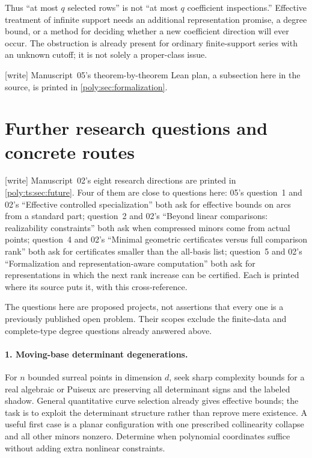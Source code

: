 \documentclass[11pt,a4paper]{article}
\numberwithin{equation}{section}
\theoremstyle{plain}
\newcommand{\wtag}{\textup{[write]}}%
\begin{document}
Thus ``at most $q$ selected rows'' is not ``at most $q$ coefficient
inspections.'' Effective treatment of infinite support needs an additional
representation promise, a degree bound, or a method for deciding whether
a new coefficient direction will ever occur. The obstruction is already
present for ordinary finite-support series with an unknown cutoff; it is
not solely a proper-class issue.

\noindent\wtag{} Manuscript~05's theorem-by-theorem Lean plan, a subsection
here in the source, is printed in \cref{poly:sec:formalization}.


\section{Further research questions and concrete routes}
\label{poly:sec:questions}
\noindent\wtag{} Manuscript~02's eight research directions are printed in
\cref{poly:ts:sec:future}. Four of them are close to questions here: 05's
question~1 and 02's ``Effective controlled specialization'' both ask for
effective bounds on arcs from a standard part; question~2 and 02's
``Beyond linear comparisons: realizability constraints'' both ask when
compressed minors come from actual points; question~4 and 02's ``Minimal
geometric certificates versus full comparison rank'' both ask for
certificates smaller than the all-basis list; question~5 and 02's
``Formalization and representation-aware computation'' both ask for
representations in which the next rank increase can be certified. Each is
printed where its source puts it, with this cross-reference.

The questions here are proposed projects, not assertions that every one is
a previously published open problem. Their scopes exclude the finite-data
and complete-type degree questions already answered above.

\paragraph{1. Moving-base determinant degenerations.}
For $n$ bounded surreal points in dimension $d$, seek sharp complexity
bounds for a real algebraic or Puiseux arc preserving all determinant
signs and the labeled shadow. General quantitative curve selection already
gives effective bounds; the task is to exploit the determinant structure
rather than reprove mere existence. A useful first case is a planar
configuration with one prescribed collinearity collapse and all other
minors nonzero. Determine when polynomial coordinates suffice without
adding extra nonlinear constraints.
\end{document}

